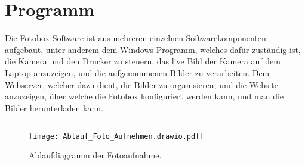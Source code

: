 \graphicspath{{images/program}}

\section{Programm}


Die Fotobox Software ist aus mehreren einzelnen Softwarekomponenten aufgebaut,
unter anderem dem Windows Programm, welches dafür zuständig ist, die Kamera
und den Drucker zu steuern, das live Bild der Kamera auf dem Laptop anzuzeigen,
und die aufgenommenen Bilder zu verarbeiten. Dem Webserver, welcher dazu dient,
die Bilder zu organisieren, und die Website anzuzeigen, über welche die Fotobox
konfiguriert werden kann, und man die Bilder herunterladen kann.

\subsection{}
\begin{figure}[H]
    \centering
    \texttt{[image: Ablauf\_Foto\_Aufnehmen.drawio.pdf]}
    \caption{Ablaufdiagramm der Fotoaufnahme.}
    \label{fig:Ablauf_Foto_Aufnehmen}
\end{figure}